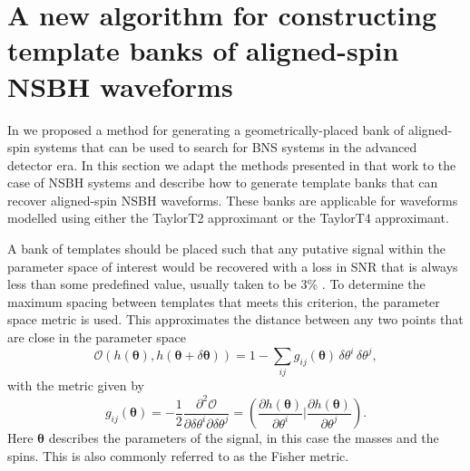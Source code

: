 \section{A new algorithm for constructing template banks of aligned-spin NSBH 
waveforms}
\label{sec:bank_method}

In \cite{Brown:2012qf} we proposed a method for generating a
geometrically-placed bank of aligned-spin
systems that can be used to search for \ac{BNS} systems in the advanced detector
era. In this section we adapt the methods presented in that work to the case of
\ac{NSBH} systems and describe how to generate template banks that can recover
aligned-spin \ac{NSBH} waveforms. These banks are applicable for waveforms
modelled using either the TaylorT2 approximant or the TaylorT4 approximant.

A bank of templates should be placed such that any putative signal
within the parameter space of interest would be recovered with a loss in SNR
that is always
less than some predefined value, usually taken to be 3\%
\cite{Poisson:1995ef,Owen:1995tm,Owen:1998dk,Babak:2006ty,
Cokelaer:2007kx,Babak:2012zx}.
To determine the maximum spacing between templates that meets this criterion,
the parameter space metric is used. This approximates the distance between any
two points that are close in the parameter space \cite{Owen:1995tm}
%
\begin{equation}
\label{eq:cbc_metric2}
\mathcal{O}(h(\bm{\theta}),h(\bm{\theta}+\delta\bm{\theta})) =
  1 - \sum_{ij} g_{ij}(\bm{\theta}) \,\delta\theta^i \,\delta\theta^j,
\end{equation}
%
with the metric given by
\begin{equation}
\label{eq:cbc_metric}
g_{ij}(\boldsymbol{\theta}) = - \frac{1}{2} \frac{\partial^2
\mathcal{O}}{\partial \delta\theta^i \partial
\delta\theta^j} = \left(\frac{\partial h(\boldsymbol{\theta})}{\partial
\theta^i} \bigg|
\frac{\partial h(\boldsymbol{\theta})}{\partial \theta^j}\right).
\end{equation}
Here $\bm{\theta}$ describes the parameters of the signal, in this case the
masses and the spins. This is also commonly referred to as the Fisher metric. 

